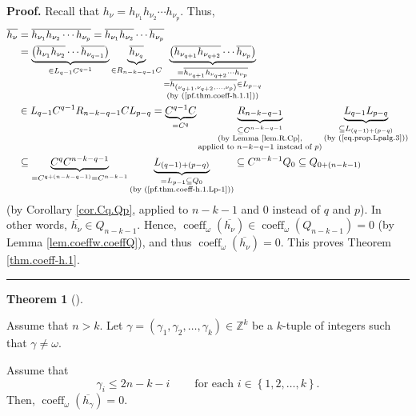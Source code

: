 \documentclass[numbers=enddot,12pt,final,onecolumn,notitlepage]{scrartcl}%
\theoremstyle{definition}
\newtheorem{theo}{Theorem}[section]
\newenvironment{theorem}[1][]
{\begin{theo}[#1]\begin{leftbar}}
{\end{leftbar}\end{theo}}
\newenvironment{proof}[1][Proof]{\noindent\textbf{#1.} }{\ \rule{0.5em}{0.5em}}
\begin{document}
\begin{proof}
Recall that $h_{\nu}=h_{\nu_{1}}h_{\nu_{2}}\cdots h_{\nu_{p}}$. Thus,%
\begin{align*}
\overline{h_{\nu}}  &  =\overline{h_{\nu_{1}}h_{\nu_{2}}\cdots h_{\nu_{p}}%
}=\overline{h_{\nu_{1}}}\overline{h_{\nu_{2}}}\cdots\overline{h_{\nu_{p}}}\\
&  =\underbrace{\left(  \overline{h_{\nu_{1}}}\overline{h_{\nu_{2}}}%
\cdots\overline{h_{\nu_{q-1}}}\right)  }_{\in L_{q-1}C^{q-1}}%
\underbrace{\overline{h_{\nu_{q}}}}_{\in R_{n-k-q-1}C}\underbrace{\left(
\overline{h_{\nu_{q+1}}}\overline{h_{\nu_{q+2}}}\cdots\overline{h_{\nu_{p}}%
}\right)  }_{\substack{=\overline{h_{\nu_{q+1}}h_{\nu_{q+2}}\cdots h_{\nu_{p}%
}}\\=\overline{h_{\left(  \nu_{q+1},\nu_{q+2},\ldots,\nu_{p}\right)  }}\in
L_{p-q}\\\text{(by (\ref{pf.thm.coeff-h.1.1}))}}}\\
&  \in L_{q-1}C^{q-1}R_{n-k-q-1}CL_{p-q}=\underbrace{C^{q-1}C}_{=C^{q}%
}\underbrace{R_{n-k-q-1}}_{\substack{\subseteq C^{n-k-q-1}\\\text{(by Lemma
\ref{lem.R.Cp},}\\\text{applied to }n-k-q-1\text{ instead of }p\text{)}%
}}\underbrace{L_{q-1}L_{p-q}}_{\substack{\subseteq L_{\left(  q-1\right)
+\left(  p-q\right)  }\\\text{(by (\ref{eq.prop.Lpalg.3}))}}}\\
&  \subseteq\underbrace{C^{q}C^{n-k-q-1}}_{=C^{q+\left(  n-k-q-1\right)
}=C^{n-k-1}}\underbrace{L_{\left(  q-1\right)  +\left(  p-q\right)  }%
}_{\substack{=L_{p-1}\subseteq Q_{0}\\\text{(by (\ref{pf.thm.coeff-h.1.Lp-1}%
))}}}\subseteq C^{n-k-1}Q_{0}\subseteq Q_{0+\left(  n-k-1\right)  }%
\end{align*}
(by Corollary \ref{cor.Cq.Qp}, applied to $n-k-1$ and $0$ instead of $q$ and
$p$). In other words, $\overline{h_{\nu}}\in Q_{n-k-1}$. Hence,
$\operatorname*{coeff}\nolimits_{\omega}\left(  \overline{h_{\nu}}\right)
\in\operatorname*{coeff}\nolimits_{\omega}\left(  Q_{n-k-1}\right)  =0$ (by
Lemma \ref{lem.coeffw.coeffQ}), and thus $\operatorname*{coeff}%
\nolimits_{\omega}\left(  \overline{h_{\nu}}\right)  =0$. This proves Theorem
\ref{thm.coeff-h.1}.
\end{proof}

\begin{theorem}
\label{thm.coeff-h.2}Assume that $n>k$. Let $\gamma=\left(  \gamma_{1}%
,\gamma_{2},\ldots,\gamma_{k}\right)  \in\mathbb{Z}^{k}$ be a $k$-tuple of
integers such that $\gamma\neq\omega$.

Assume that
\begin{equation}
\gamma_{i}\leq2n-k-i\ \ \ \ \ \ \ \ \ \ \text{for each }i\in\left\{
1,2,\ldots,k\right\}  . \label{eq.lem.coeff-h.2.ass1}%
\end{equation}
Then, $\operatorname*{coeff}\nolimits_{\omega}\left(  \overline{h_{\gamma}%
}\right)  =0$.
\end{theorem}
\end{document}
